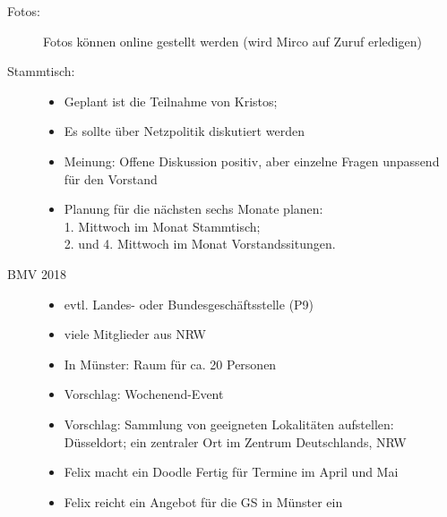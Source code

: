 \begin{Protokoll}
    \begin{description}
        \item[Fotos:] Fotos können online gestellt werden (wird Mirco auf Zuruf erledigen)
        \item[Stammtisch:]
            \begin{itemize} 
                \item Geplant ist die Teilnahme von Kristos; 
                \item Es sollte über Netzpolitik diskutiert werden
                \item Meinung: Offene Diskussion positiv, aber einzelne Fragen unpassend für den Vorstand
                \item Planung für die nächsten sechs Monate planen: \\
                    1. Mittwoch im Monat Stammtisch; \\
                    2. und 4. Mittwoch im Monat Vorstandssitungen. 
            \end{itemize}
        \item[BMV 2018]
             \begin{itemize} 
                \item evtl. Landes- oder Bundesgeschäftsstelle (P9)
                \item viele Mitglieder aus NRW
                \item In Münster: Raum für ca. 20 Personen
                \item Vorschlag: Wochenend-Event
                \item Vorschlag: Sammlung von geeigneten Lokalitäten aufstellen: {Düsseldort; ein zentraler Ort im Zentrum Deutschlands, NRW}
                \item Felix macht ein Doodle Fertig für Termine im April und Mai
                \item Felix reicht ein Angebot für die GS in Münster ein
             \end{itemize}
    \end{description}
    
  
    
    
\end{Protokoll}


